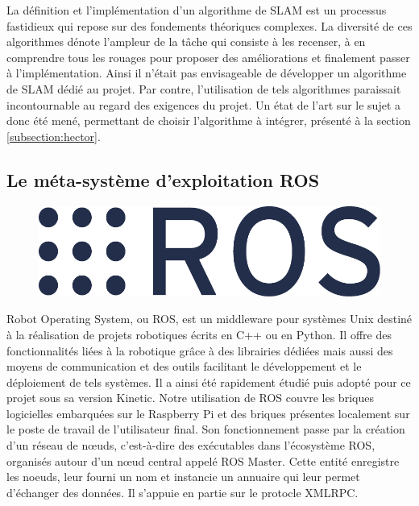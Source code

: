 La définition et l'implémentation d'un algorithme de SLAM est un processus fastidieux qui repose sur des fondements théoriques complexes. 
La diversité de ces algorithmes\cite{Bib_openslam} dénote l'ampleur de la tâche qui consiste à les recenser, à en comprendre tous les rouages pour proposer des améliorations et finalement passer à l'implémentation. 
Ainsi il n'était pas envisageable de développer un algorithme de SLAM dédié au projet. 
Par contre, l'utilisation de tels algorithmes paraissait incontournable au regard des exigences du projet. 
Un état de l'art sur le sujet a donc été mené, permettant de choisir l'algorithme à intégrer, présenté à la section \ref{subsection:hector}. 

  \subsection{Le méta-système d'exploitation ROS}

\begin{figure}[h]
  \centering
    \includegraphics[width=.2\linewidth]{figures/ros_logo}  
  \label{fig:ros}
\end{figure} 
  
Robot Operating System, ou \gls{ROS}, est un middleware pour systèmes Unix destiné à la réalisation de projets robotiques écrits en C++ ou en Python.
Il offre des fonctionnalités liées à la robotique grâce à des librairies dédiées mais aussi des moyens de communication et des outils facilitant le développement et le déploiement de tels systèmes. 
Il a ainsi été rapidement étudié puis adopté pour ce projet sous sa version Kinetic. 
Notre utilisation de \gls{ROS} couvre les briques logicielles embarquées sur le Raspberry Pi et des briques présentes localement sur le poste de travail de l'utilisateur final. 
Son fonctionnement passe par la création d'un réseau de n\oe{}uds\cite{Bib_ROS_nodes}, c'est-à-dire des exécutables dans l'écosystème \gls{ROS}, organisés autour d'un n\oe{}ud central appelé \gls{ROS} Master\cite{Bib_ROS_master}.
Cette entité enregistre les noeuds, leur fourni un nom et instancie un annuaire qui leur permet d'échanger des données. 
Il s'appuie en partie sur le protocle \gls{XMLRPC}.

